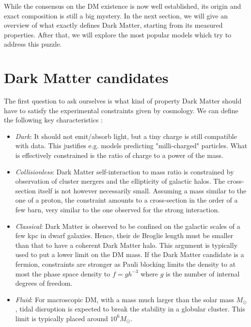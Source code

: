 While the consensus on the DM  existence is now well established, its origin and exact composition is still a big mystery. In the next section, we will give an overview of what exactly defines Dark Matter, starting from its measured properties. After that, we will explore the most popular models which try to address this puzzle.

\section{Dark Matter candidates}
\label{ch1:sec:dm-candidates}

The first question to ask ourselves is what kind of property Dark Matter should have to satisfy the experimental constraints given by cosmology. We can define the following key characteristics \cite{Profumo:2019ujg}:

\begin{itemize}
\item \textit{Dark}: It should not emit/absorb light, but a tiny charge is still compatible with data. This justifies e.g. models predicting "milli-charged" particles. What is effectively constrained is the ratio of charge to a power of the mass.
\item \textit{Collisionless}: Dark Matter self-interaction to mass ratio is constrained by observation of cluster mergers and the ellipticity of galactic halos. The cross-section itself is not however necessarily small. Assuming a mass similar to the one of a proton, the constraint amounts to a cross-section in the order of a few barn, very similar to the one observed for the strong interaction.
\item \textit{Classical}: Dark Matter is observed to be confined on the galactic scales of a few kpc in dwarf galaxies. Hence, their de Broglie length must be smaller than that to have a coherent Dark Matter halo. This argument is typically used to put a lower limit on the DM mass. If the Dark Matter candidate is a fermion, constraints are stronger as Pauli blocking limits the density to at most the phase space density to $f=gh^{-3}$ where $g$ is the number of internal degrees of freedom.
\item \textit{Fluid}: For macroscopic DM, with a mass much larger than the solar mass $M_{\odot}$, tidal disruption is expected to break the stability in a globular cluster. This limit is typically placed around $10^6 M_{\odot}$.
\end{itemize}

